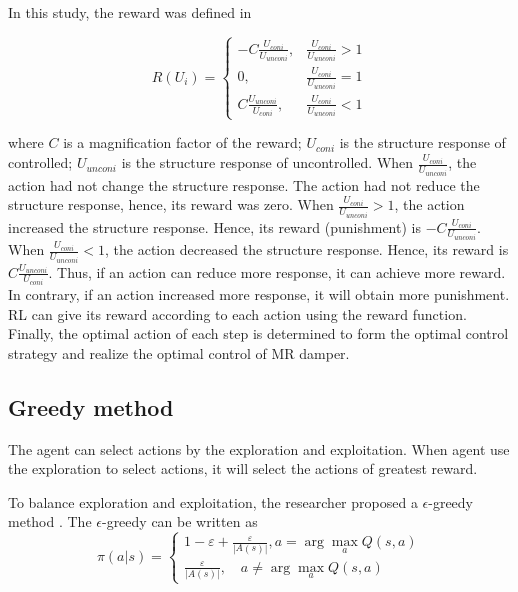 In this study, the reward was defined in

\begin{equation}
R(U_i)=
\begin{cases}
-C \frac{U_{coni}}{U_{unconi}},  & \frac{U_{coni}}{U_{unconi}} > 1 \\
0, & \frac{U_{coni}}{U_{unconi}} = 1 \\
C \frac{U_{unconi}}{U_{coni}}, & \frac{U_{coni}}{U_{unconi}} < 1 
\end{cases}
\end{equation}

where $C$ is a magnification factor of the reward; $U_{coni}$ is the structure response of controlled; $U_{unconi}$ is the structure response of uncontrolled. When $ \frac{U_{coni}}{U_{unconi}} $, the action had not change the structure response. The action had not reduce the structure response, hence, its reward was zero. When $\frac{U_{coni}}{U_{unconi}} > 1$, the action increased the structure response. Hence, its reward (punishment) is $-C \frac{U_{coni}}{U_{unconi}}$. When $\frac{U_{coni}}{U_{unconi}} < 1$, the action decreased the structure response. Hence, its reward is $C \frac{U_{unconi}}{U_{coni}}$. Thus, if an action can reduce more response, it can achieve more reward. In contrary, if an action increased more response, it will obtain more punishment. RL can give its reward according to each action using the reward function. Finally, the optimal action of each step is determined to form the optimal control strategy and realize the optimal control of MR damper.

\subsection{Greedy method}
The agent can select actions by the exploration and exploitation. When agent use the exploration to select actions, it will select the actions of greatest reward.

To balance exploration and exploitation, the researcher proposed a $\epsilon$-greedy method \citep{}. The $\epsilon$-greedy can be written as
\begin{equation}
\pi(a | s)=\left\{\begin{array}{c}
{1-\varepsilon+\frac{\varepsilon}{|A(s)|}, a=\arg \max _{a} Q(s, a)} \\
{\frac{\varepsilon}{|A(s)|}, \quad a \neq \arg \max _{a} Q(s, a)}
\end{array}\right.
\end{equation}

